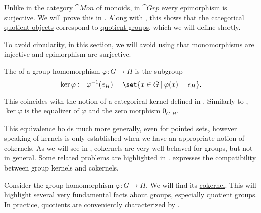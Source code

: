 \begin{definition}
\begin{thmenum}
    Unlike in the category \hyperref[def:monoid/category]{\( \cat{Mon} \)} of monoids, in \( \cat{Grp} \) every epimorphism is surjective. We will prove this in . Along with , this shows that the \hyperref[def:subobject_and_quotient]{categorical quotient objects} correspond to \hyperref[def:group/quotient]{quotient groups}, which we will define shortly.

    To avoid circularity, in this section, we will avoid using that monomorphisms are injective and epimorphism are surjective.

     The  of a group homomorphism \( \varphi: G \to H \) is the subgroup
    \begin{equation*}
      \ker \varphi \coloneqq \varphi^{-1}(e_H) = \set{ x \in G \given \varphi(x) = e_H }.
    \end{equation*}

    This coincides with the notion of a categorical kernel defined in . Similarly to , \( \ker \varphi \) is the equalizer of \( \varphi \) and the zero morphism \( 0_{G,H} \).

    This equivalence holds much more generally, even for \hyperref[rem:pointed_set]{pointed sets}, however speaking of kernels is only established when we have an appropriate notion of cokernels. As we will see in , cokernels are very well-behaved for groups, but not in general. Some related problems are highlighted in \cite[ch. 8]{Golan2010}.  expresses the compatibility between group kernels and cokernels.

     Consider the group homomorphism \( \varphi: G \to H \). We will find its \hyperref[def:zero_morphisms/cokernel]{cokernel}. This will highlight several very fundamental facts about groups, especially quotient groups. In practice, quotients are conveniently characterized by .


\end{thmenum}
\end{definition}
